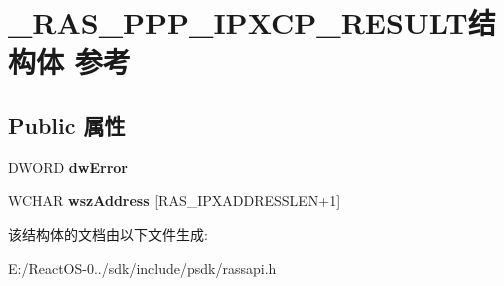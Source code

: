 \hypertarget{struct___r_a_s___p_p_p___i_p_x_c_p___r_e_s_u_l_t}{}\section{\+\_\+\+R\+A\+S\+\_\+\+P\+P\+P\+\_\+\+I\+P\+X\+C\+P\+\_\+\+R\+E\+S\+U\+L\+T结构体 参考}
\label{struct___r_a_s___p_p_p___i_p_x_c_p___r_e_s_u_l_t}
\subsection*{Public 属性}
\begin{DoxyCompactItemize}
\item 
\mbox{\label{struct___r_a_s___p_p_p___i_p_x_c_p___r_e_s_u_l_t_a04cbbcb7ba6ea714ff1166ce594990ea}} 
D\+W\+O\+RD {\bfseries dw\+Error}
\item 
\mbox{\label{struct___r_a_s___p_p_p___i_p_x_c_p___r_e_s_u_l_t_a12892b35afca10d78c762c52d8aab234}} 
W\+C\+H\+AR {\bfseries wsz\+Address} \mbox{[}R\+A\+S\+\_\+\+I\+P\+X\+A\+D\+D\+R\+E\+S\+S\+L\+EN+1\mbox{]}
\end{DoxyCompactItemize}


该结构体的文档由以下文件生成\+:\begin{DoxyCompactItemize}
\item 
E\+:/\+React\+O\+S-\/0../sdk/include/psdk/rassapi.\+h\end{DoxyCompactItemize}
